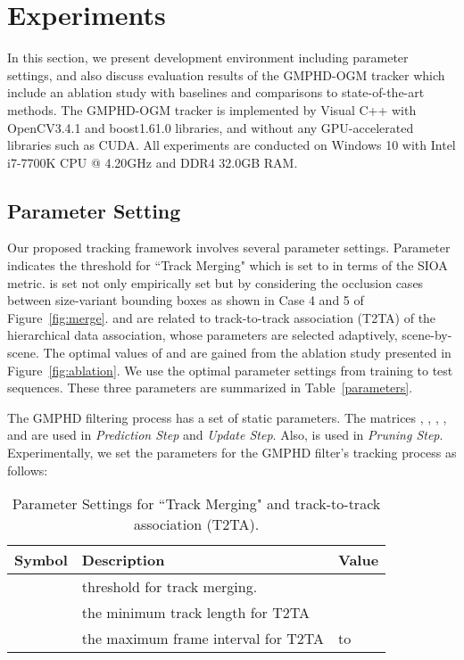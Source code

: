 \documentclass[journal]{IEEEtran}
\newcounter{ct}
\begin{document}
\section{Experiments}
\label{Experiments}

In this section, we present development environment including parameter settings, and also discuss evaluation results of the GMPHD-OGM tracker which include an ablation study with baselines and comparisons to state-of-the-art methods.
The GMPHD-OGM tracker is implemented by Visual C++ with OpenCV3.4.1 and boost1.61.0 libraries, and without any GPU-accelerated libraries such as CUDA.
All experiments are conducted on Windows 10 with Intel i7-7700K CPU @ 4.20GHz and DDR4 32.0GB RAM.

\subsection{Parameter Setting}
\label{subsec:params}
Our proposed tracking framework involves several parameter settings.
Parameter  indicates the threshold for ``Track Merging" which is set to  in terms of the SIOA metric.
 is set not only empirically set but by considering the occlusion cases between size-variant bounding boxes as shown in Case 4 and 5 of Figure~\ref{fig:merge}.
 and  are related to track-to-track association (T2TA) of the hierarchical data association, whose parameters are selected adaptively, scene-by-scene. 
The optimal values of  and  are gained from the ablation study presented in Figure~\ref{fig:ablation}. We use the optimal parameter settings from training to test sequences. 
These three parameters are summarized in Table~\ref{parameters}. 


The GMPHD filtering process has a set of static parameters.
The matrices , , , , and  are used in \textit{Prediction Step} and  \textit{Update Step}.
Also,  is used in \textit{Pruning Step}.
Experimentally, we set the parameters for the GMPHD filter's tracking process as follows:



\begin{table}[b]
\caption{Parameter Settings for ``Track Merging" and track-to-track association (T2TA).}
\label{parameters}
\setlength{\tabcolsep}{3pt}
\begin{tabular}{|p{25pt}|p{150pt}|p{30pt}|}
\hline
\textbf{Symbol} & 
\textbf{Description} & 
\textbf{Value} \\
\hline
& 
threshold for track merging. &
 \\
\hline
& 
the minimum track length for T2TA & 
 \\
\hline
&
the maximum frame interval for T2TA & 
 to  \\
\hline
\end{tabular}
\label{tab1}
\end{table}
\end{document}
